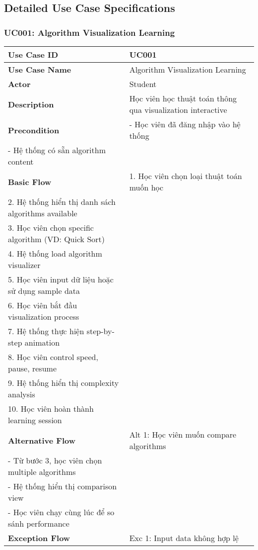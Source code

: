\subsection{Detailed Use Case Specifications}
\label{subsec:detailed-usecase-specs}

\subsubsection{UC001: Algorithm Visualization Learning}

\begin{table}[H]
\centering
\begin{tabular}{|p{3cm}|p{10cm}|}
\hline
\textbf{Use Case ID} & UC001 \\
\hline
\textbf{Use Case Name} & Algorithm Visualization Learning \\
\hline
\textbf{Actor} & Student \\
\hline
\textbf{Description} & Học viên học thuật toán thông qua visualization interactive \\
\hline
\textbf{Precondition} & 
- Học viên đã đăng nhập vào hệ thống \\
- Hệ thống có sẵn algorithm content \\
\hline
\textbf{Basic Flow} & 
1. Học viên chọn loại thuật toán muốn học \\
2. Hệ thống hiển thị danh sách algorithms available \\
3. Học viên chọn specific algorithm (VD: Quick Sort) \\
4. Hệ thống load algorithm visualizer \\
5. Học viên input dữ liệu hoặc sử dụng sample data \\
6. Học viên bắt đầu visualization process \\
7. Hệ thống thực hiện step-by-step animation \\
8. Học viên control speed, pause, resume \\
9. Hệ thống hiển thị complexity analysis \\
10. Học viên hoàn thành learning session \\
\hline
\textbf{Alternative Flow} & 
Alt 1: Học viên muốn compare algorithms \\
- Từ bước 3, học viên chọn multiple algorithms \\
- Hệ thống hiển thị comparison view \\
- Học viên chạy cùng lúc để so sánh performance \\
\hline
\textbf{Exception Flow} & 
Exc 1: Input data không hợp lệ \\

\end{tabular}
\end{table}
